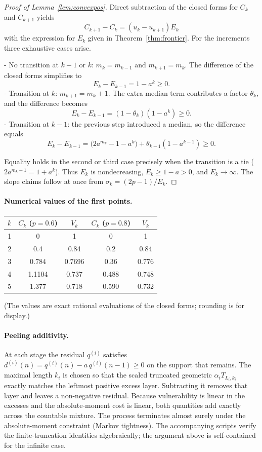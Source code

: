\documentclass[conference]{IEEEtran}
\begin{document}
\begin{proof}[Proof of Lemma~\ref{lem:convexpos}]
Direct subtraction of the closed forms for \(C_k\) and \(C_{k+1}\) yields
\[
C_{k+1}-C_k=(u_k-u_{k+1})E_k
\]
with the expression for \(E_k\) given in Theorem~\ref{thm:frontier}. For the increments three exhaustive cases arise.

- No transition at \(k-1\) or \(k\): \(m_k=m_{k-1}\) and \(m_{k+1}=m_k\). The difference of the closed forms simplifies to
  \[
  E_k-E_{k-1}=1-a^k\ge0.
  \]
- Transition at \(k\): \(m_{k+1}=m_k+1\). The extra median term contributes a factor \(\theta_k\), and the difference becomes
  \[
  E_k-E_{k-1}=(1-\theta_k)(1-a^k)\ge0.
  \]
- Transition at \(k-1\): the previous step introduced a median, so the difference equals
  \[
  E_k-E_{k-1}=\bigl(2a^{m_k}-1-a^k\bigr)+\theta_{k-1}(1-a^{k-1})\ge0.
  \]

Equality holds in the second or third case precisely when the transition is a tie (\(2a^{m_k+1}=1+a^k\)). Thus \(E_k\) is nondecreasing, \(E_k\ge1-a>0\), and \(E_k\to\infty\). The slope claims follow at once from \(\sigma_k=(2p-1)/E_k\).
\end{proof}

\paragraph{Numerical values of the first points.}
\begin{center}
\begin{tabular}{c|cc|cc}
\(k\) & \(C_k\) (\(p=0.6\)) & \(V_k\) & \(C_k\) (\(p=0.8\)) & \(V_k\) \\
\hline
1 & 0 & 1 & 0 & 1 \\
2 & 0.4 & 0.84 & 0.2 & 0.84 \\
3 & 0.784 & 0.7696 & 0.36 & 0.776 \\
4 & 1.1104 & 0.737 & 0.488 & 0.748 \\
5 & 1.377 & 0.718 & 0.590 & 0.732 \\
\end{tabular}
\end{center}
(The values are exact rational evaluations of the closed forms; rounding is for display.)

\paragraph{Peeling additivity.}
At each stage the residual \(q^{(i)}\) satisfies \(d^{(i)}(n)=q^{(i)}(n)-a\,q^{(i)}(n-1)\ge0\) on the support that remains. The maximal length \(k_i\) is chosen so that the scaled truncated geometric \(\alpha_i T_{L_i,k_i}\) exactly matches the leftmost positive excess layer. Subtracting it removes that layer and leaves a non-negative residual. Because vulnerability is linear in the excesses and the absolute-moment cost is linear, both quantities add exactly across the countable mixture. The process terminates almost surely under the absolute-moment constraint (Markov tightness). The accompanying scripts verify the finite-truncation identities algebraically; the argument above is self-contained for the infinite case.
\end{document}

